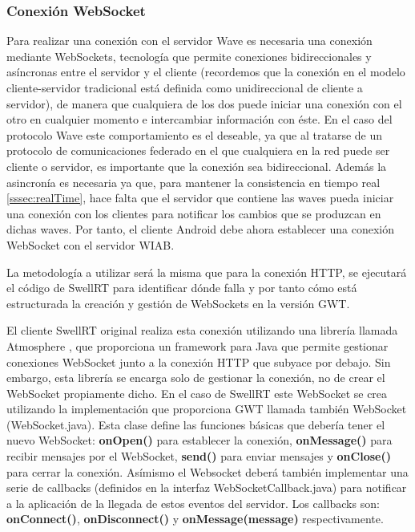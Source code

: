     		\subsubsection{Conexión WebSocket}\label{sssec:conWave}
    
    Para realizar una conexión con el servidor Wave es necesaria una conexión mediante WebSockets\cite{ref:webSocket_ref}, tecnología que permite conexiones bidireccionales y asíncronas entre el servidor y el cliente (recordemos que la conexión en el modelo cliente-servidor tradicional está definida como unidireccional de cliente a servidor), de manera que cualquiera de los dos puede iniciar una conexión con el otro en cualquier momento e intercambiar información con éste. En el caso del protocolo Wave este comportamiento es el deseable, ya que al tratarse de un protocolo de comunicaciones federado en el que cualquiera en la red puede ser cliente o servidor, es importante que la conexión sea bidireccional. Además la asincronía es necesaria ya que, para mantener la consistencia en tiempo real \ref{sssec:realTime}, hace falta que el servidor que contiene las waves pueda iniciar una conexión con los clientes para notificar los cambios que se produzcan en dichas waves. Por tanto, el cliente Android debe ahora establecer una conexión WebSocket con el servidor WIAB. 
    
    La metodología a utilizar será la misma que para la conexión HTTP, se ejecutará el código de SwellRT para identificar dónde falla y por tanto cómo está estructurada la creación y gestión de WebSockets en la versión GWT.
    
    El cliente SwellRT original realiza esta conexión utilizando una librería llamada Atmosphere \cite{ref:atmosphere}, que proporciona un framework para Java que permite gestionar conexiones WebSocket junto a la conexión HTTP que subyace por debajo. Sin embargo, esta librería se encarga solo de gestionar la conexión, no de crear el WebSocket propiamente dicho. En el caso de SwellRT este WebSocket se crea utilizando la implementación que proporciona GWT llamada también WebSocket (WebSocket.java). Esta clase define las funciones básicas que debería tener el nuevo WebSocket: \textbf{onOpen()} para establecer la conexión, \textbf{onMessage()} para recibir mensajes por el WebSocket, \textbf{send()} para enviar mensajes y \textbf{onClose()} para cerrar la conexión. Asímismo el Websocket deberá también implementar una serie de callbacks (definidos en la interfaz WebSocketCallback.java) para notificar a la aplicación de la llegada de estos eventos del servidor. Los callbacks son: \textbf{onConnect()}, \textbf{onDisconnect()} y \textbf{onMessage(message)} respectivamente.
	
